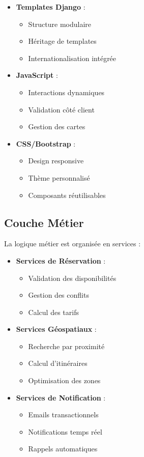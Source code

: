 \begin{itemize}
    \item \textbf{Templates Django} :
    \begin{itemize}
        \item Structure modulaire
        \item Héritage de templates
        \item Internationalisation intégrée
    \end{itemize}
    
    \item \textbf{JavaScript} :
    \begin{itemize}
        \item Interactions dynamiques
        \item Validation côté client
        \item Gestion des cartes
    \end{itemize}
    
    \item \textbf{CSS/Bootstrap} :
    \begin{itemize}
        \item Design responsive
        \item Thème personnalisé
        \item Composants réutilisables
    \end{itemize}
\end{itemize}

\subsection{Couche Métier}
La logique métier est organisée en services :

\begin{itemize}
    \item \textbf{Services de Réservation} :
    \begin{itemize}
        \item Validation des disponibilités
        \item Gestion des conflits
        \item Calcul des tarifs
    \end{itemize}
    
    \item \textbf{Services Géospatiaux} :
    \begin{itemize}
        \item Recherche par proximité
        \item Calcul d'itinéraires
        \item Optimisation des zones
    \end{itemize}
    
    \item \textbf{Services de Notification} :
    \begin{itemize}
        \item Emails transactionnels
        \item Notifications temps réel
        \item Rappels automatiques
    \end{itemize}
\end{itemize}


